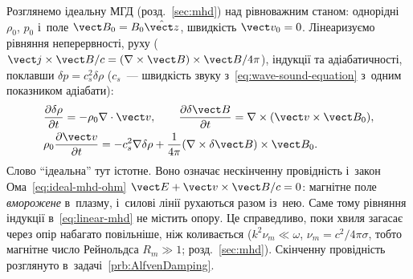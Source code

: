 Розглянемо ідеальну МГД (розд.~\ref{sec:mhd}) над рівноважним станом: однорідні $\rho_0$, $p_0$ і~поле
$\vect B_0=B_0\hat{\vect z}$, швидкість $\vect v_0=0$. Лінеаризуємо рівняння неперервності,
руху ($\vect j\times\vect B/c=(\nabla\times\vect B)\times\vect B/4\pi$), індукції та
адіабатичності, поклавши $\delta p=c_s^2\delta\rho$ ($c_s$~--- швидкість звуку з~\eqref{eq:wave-sound-equation} з~одним показником адіабати):
\begin{equation}\label{eq:linear-mhd}
\begin{aligned}
	&\frac{\partial\delta\rho}{\partial t}=-\rho_0\nabla\cdot\vect v,\qquad
	\frac{\partial\delta\vect B}{\partial t}=\nabla\times(\vect v\times\vect B_0),\\
	&\rho_0\frac{\partial\vect v}{\partial t}=-c_s^2\nabla\delta\rho+\frac1{4\pi}(\nabla\times\delta\vect B)\times\vect B_0.
\end{aligned}
\end{equation}
Слово \enquote{ідеальна} тут істотне. Воно означає нескінченну провідність і~закон Ома~\eqref{eq:ideal-mhd-ohm}
$\vect E+\vect v\times\vect B/c=0$: магнітне поле \emph{вморожене} в~плазму, і~силові лінії рухаються разом із~нею.
Саме тому рівняння індукції в~\eqref{eq:linear-mhd} не містить опору. Це справедливо, поки хвиля загасає
через опір набагато повільніше, ніж коливається ($k^2\nu_m\ll\omega$, $\nu_m=c^2/4\pi\sigma$, тобто магнітне
число Рейнольдса $R_m\gg1$; розд.~\ref{sec:mhd}). Скінченну провідність розглянуто в~задачі~\ref{prb:AlfvenDamping}.

